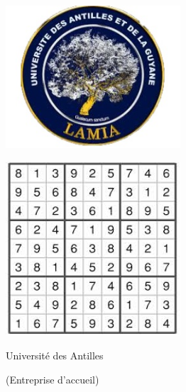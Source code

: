 \begin{titlepage}
    \enlargethispage{2cm}

    \begin{center}
        \vspace*{1cm}
        \includegraphics[width=6.5cm]{./images/lamialogo.jpg}
        \vspace*{0.5cm}

        \textsc{\@title}
        \HRule
        \vspace*{0.5cm}

        \large{\@author}
    \end{center}

    \begin{center}
      \vspace*{2cm}
      \includegraphics[width=6.5cm]{./images/sudoku1.jpeg}
    \end{center}

    \vspace*{2cm}

    \begin{center}
        Université des Antilles

        (Entreprise d'accueil)
    \end{center}

\end{titlepage}
\ClearShipoutPicture
